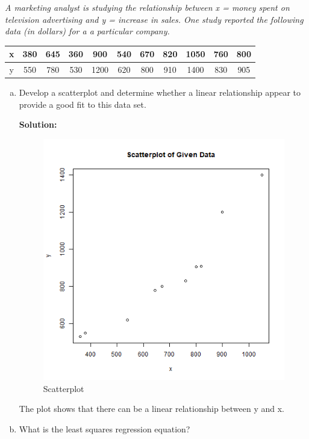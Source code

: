 \documentclass[12pt,letterpaper]{article}
\begin{document}
\textit{A marketing analyst is studying the relationship between x = money spent on television advertising and y = increase in sales. One study reported the following data (in dollars) for a a particular company.}
\begin{center}
  \begin{tabular}{ c|cccccccccc }
    \hline
    x & 380 & 645 & 360 & 900 & 540 & 670 & 820 & 1050 & 760 & 800\\
    \hline
    y & 550 & 780 & 530 & 1200 & 620 & 800 & 910 & 1400 & 830 & 905\\
    \hline
  \end{tabular}
\end{center}

\begin{enumerate}[a.] \setlength{\itemsep}{30pt}
  \item Develop a scatterplot and determine whether a linear relationship appear to provide a good fit to this data set.
  
  \textbf{Solution:}
  \begin{figure}[h]
    \centering
    \includegraphics[width=12cm]{Scatterplot.png}
    \caption{Scatterplot}
  \end{figure}
  The plot shows that there can be a linear relationship between y and x.
  \newpage
  \item What is the least squares regression equation?


\end{enumerate}
\end{document}
